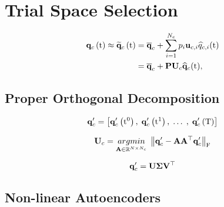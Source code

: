\section{Trial Space Selection}

\begin{equation}\label{eq:solApprox}
    \begin{aligned}
        \consFunc{\timeVar} \approx \consFuncRom{\timeVar} &= \consVecCent + \sum_{\dummyIdx=1}^{\numConsModes} \consScaleVar_\dummyIdx \consTrialVecIdx \consVarCoef (\timeVar) \\
        &= \consAffineMap(\timeVar),
    \end{aligned}
\end{equation}

\subsection{Proper Orthogonal Decomposition}

\begin{equation}
	\consDataMatUns = \left[ \consFuncUns{\initTime}, \; \consFuncUns{\timeVar^1}, \; \hdots \; , \; \consFuncUns{\finalTime} \right]
\end{equation}

\begin{equation}\label{eq:podL2Min}
    \consTrial = \argmin{\dummyMatOne \inRTwo{\numDOF}{\numConsModes}} \norm{ \consDataMatUns - \dummyMatOne \dummyMatOne^\top \consDataMatUns }_\text{F}
\end{equation}

\begin{equation}\label{eq:svd}
    \consDataMatUns = \basisMat \singVecMat \rightSingVecMat^\top
\end{equation}

\subsection{Non-linear Autoencoders}